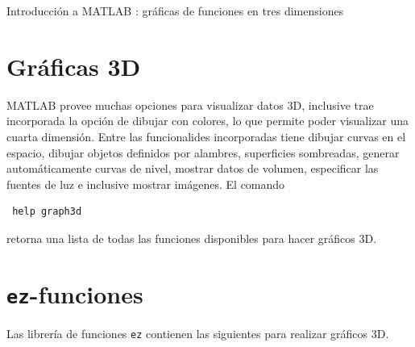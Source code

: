 \documentclass[11pt]{article}
\begin{document}

\centerline{Introducci\'on  a MATLAB \circledR: gr\'aficas de funciones en tres dimensiones} 
%

\section{Gr\'aficas 3D}
MATLAB provee muchas opciones para visualizar datos 3D, inclusive trae incorporada 
la opci\'on de dibujar con colores, lo que permite poder visualizar una cuarta dimensi\'on. 
Entre las funcionalides incorporadas tiene dibujar curvas en el espacio, dibujar 
objetos definidos por alambres, superficies sombreadas, generar autom\'aticamente curvas de nivel, 
mostrar datos de volumen, especificar las fuentes de luz e inclusive mostrar im\'agenes. El comando 
\begin{verbatim}
 help graph3d
\end{verbatim}
retorna una lista de todas las funciones disponibles para hacer gr\'aficos 3D.

\section{\texttt{ez}-funciones}
Las librer\'ia de funciones \texttt{ez} contienen las siguientes para realizar gr\'aficos 3D.
\end{document}

